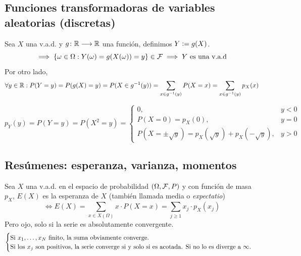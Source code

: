 \subsection{Funciones transformadoras de variables aleatorias (discretas)}
Sea $X$ una v.a.d. y $g \colon \mathbb{R} \longrightarrow \mathbb{R}$ una función, definimos $Y\vcentcolon= g(X)$.
\[\implies \{\omega \in\Omega:Y(\omega)=g(X(\omega))=y\} \in \mathcal{F} \implies Y\text{ es una v.a.d}\]
Por otro lado,
\[\forall y \in \mathbb{R}:P(Y=y)=P(g(X)=y)=P(X\in g^{-1}(y))=\sum_{x\in g^{-1}(y)}P(X=x)=\sum_{x\in g^{-1}(y)}p_X(x)\]

\begin{ejem}[$Y=x^2$]
	$$p_Y(y) = P(Y=y)=P(X^2=y)=\begin{cases}
			0,                                                                              & y <0 \\
			P(X=0)=p_X(0),                                                                  & y=0  \\
			P\left(X=\pm\sqrt{y}\right)=p_X\left(\sqrt{y}\right)+p_X\left(-\sqrt{y}\right), & y>0
		\end{cases}$$
\end{ejem}

\subsection{Resúmenes: esperanza, varianza, momentos}

\begin{defn}[Esperanza]
	Sea $X$ una v.a.d. en el espacio de probabilidad $(\Omega, \mathcal{F}, P)$ y con función de masa $p_X$, $E(X)$ es la esperanza de $X$ (también llamada media o \emph{expectatio})
	\[\iff E(X)=\sum_{x\in X(\Omega)}x\cdot P(X=x)=\sum_{j\geq 1}x_j\cdot p_X(x_j)\]
	Pero ojo, solo si la serie es absolutamente convergente.
	\[\begin{cases} \text{Si $x_1, \dots, x_N$ finito, la suma obviamente converge.} \\
			\text{Si los $x_j$ son positivos, la serie converge si y solo si es acotada. Si no lo es diverge a $\infty$.}\end{cases}\]
\end{defn}

